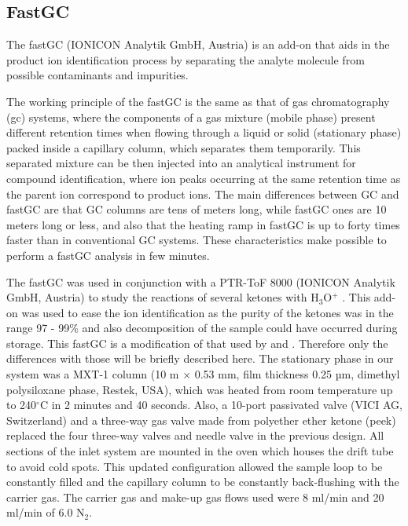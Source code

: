 \subsection{FastGC}\label{section:fastgc}

The fastGC (IONICON Analytik GmbH, Austria) is an add-on that aids in the product ion identification process by separating the analyte molecule from possible contaminants and impurities.

The working principle of the fastGC is the same as that of gas chromatography (\acrshort{gc}) systems, where
%
the components of a  gas mixture (mobile phase) present different retention times when flowing through a liquid or solid (stationary phase) packed inside a capillary column, which  separates them temporarily.
%
This separated mixture can be then injected into an analytical instrument for compound identification, where ion peaks occurring at the same retention time as the parent ion correspond to product ions.
%
The main differences between  GC and fastGC are that GC columns are tens of meters long, while fastGC ones are  10 meters long or less, and
%
also that the heating ramp in fastGC  is up to forty times faster than in conventional GC systems.
%
These characteristics make possible to perform a fastGC analysis in few minutes.



The fastGC was used in conjunction with a PTR-ToF 8000 (IONICON Analytik GmbH, Austria) to study the reactions of several ketones with H$_3$O$^+$ \cite{malaskova2019compendium}.
This add-on was used to ease the ion identification as the purity of the ketones was in the range 97 - 99\% and also decomposition of the sample could have occurred during storage.
%
This fastGC  is a modification of that used by \citeauthor{ruzsanyi2013multi} and \citeauthor{romano2014wine} \cite{ruzsanyi2013multi,romano2014wine}. Therefore only the differences with those will be briefly described here.
%
%
The stationary phase in our system was a MXT-1 column (10 m × 0.53 mm, film thickness 0.25 µm, dimethyl polysiloxane phase, Restek, USA), which was heated from room temperature up to 240$^{\circ}$C in  2 minutes and 40 seconds.
%
Also, a 10-port passivated valve (VICI AG, Switzerland) and a three-way gas valve made from polyether ether ketone (\acrshort{peek}) replaced the four three-way valves and  needle valve in the previous design.
%
All sections of the inlet system are mounted in the oven which houses the drift tube to avoid cold spots.
%
This updated configuration allowed the sample loop to be constantly filled and the capillary column to be constantly back-flushing with the carrier gas.
%
The  carrier gas and make-up gas flows used were  8 ml/min and 20 ml/min of 6.0 N$_2$.







